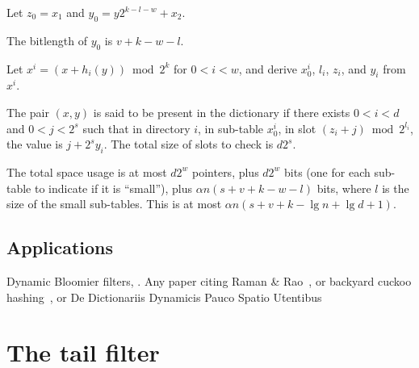 \documentclass[11pt,letterpaper]{article}
\begin{document}
Let $z_0 = x_1$ and $y_0 = y 2^{k - l - w} + x_2$.

The bitlength of $y_0$ is $v + k - w - l$.



Let $x^i = (x + h_i(y)) \bmod 2^k$ for $0 < i < w$, and derive $x^i_0$, $l_i$, $z_i$, and $y_i$ from $x^i$.

The pair $(x,y)$ is said to be present in the dictionary if there exists $0 < i < d$ and $0 < j < 2^s$ such that in directory $i$, in sub-table $x^i_0$, in slot $(z_i + j) \bmod 2^{l_i}$, the value is $j + 2^s y_i$.
The total size of slots to check is $d 2^s$.

The total space usage is at most $d 2^w$ pointers, plus $d 2^w$ bits (one for each sub-table to indicate if it is ``small''), plus $\alpha n (s + v + k - w - l)$ bits, where $l$ is the size of the small sub-tables.
This is at most $\alpha n (s + v + k - \lg n + \lg d + 1)$.





\subsection{Applications}

Dynamic Bloomier filters, \cite{DBLP:journals/corr/abs-cs-0502032}. Any paper citing Raman \& Rao~\cite{raman2003succinct}, or backyard cuckoo hashing~\cite{DBLP:journals/corr/abs-0912-5424}, or De Dictionariis Dynamicis Pauco Spatio Utentibus~\cite{DBLP:journals/corr/abs-cs-0512081}

\section{The tail filter}
\end{document}
